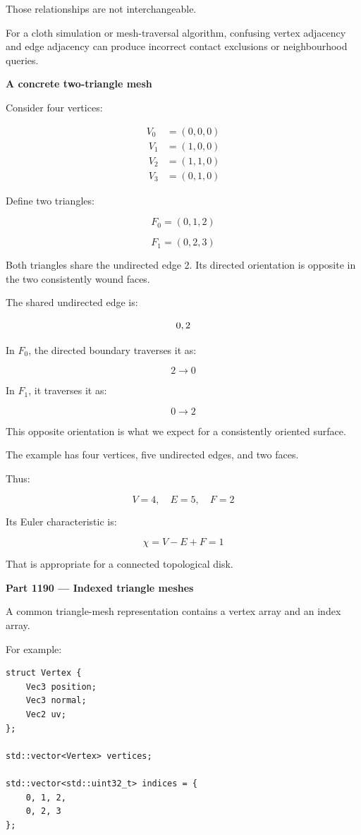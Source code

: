 Those relationships are not interchangeable.

For a cloth simulation or mesh-traversal algorithm, confusing vertex adjacency and edge adjacency can produce incorrect contact exclusions or neighbourhood queries.

\textbf{A concrete two-triangle mesh}

Consider four vertices:

\[
\begin{aligned} V_0&=(0,0,0)\\\ V_1&=(1,0,0)\\\ V_2&=(1,1,0)\\\ V_3&=(0,1,0) \end{aligned}
\]

Define two triangles:

\[
F_0=(0,1,2)
\]

\[
F_1=(0,2,3)
\]

Both triangles share the undirected edge 2. Its directed orientation is opposite in the two consistently wound faces.

The shared undirected edge is:

\[
\\{0,2\\}
\]

In \(F_0\), the directed boundary traverses it as:

\[
2\rightarrow0
\]

In \(F_1\), it traverses it as:

\[
0\rightarrow2
\]

This opposite orientation is what we expect for a consistently oriented surface.

The example has four vertices, five undirected edges, and two faces.

Thus:

\[
V=4,\quad E=5,\quad F=2
\]

Its Euler characteristic is:

\[
\chi=V-E+F=1
\]

That is appropriate for a connected topological disk.

\textbf{Part 1190 --- Indexed triangle meshes}

A common triangle-mesh representation contains a vertex array and an index array.

For example:

\begin{verbatim}
struct Vertex {
    Vec3 position;
    Vec3 normal;
    Vec2 uv;
};

std::vector<Vertex> vertices;

std::vector<std::uint32_t> indices = {
    0, 1, 2,
    0, 2, 3
};
\end{verbatim}


